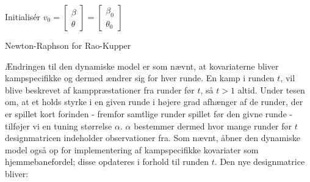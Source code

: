 \documentclass[11pt,a4paper]{article}
\begin{document}
\begin{algorithm}[H]
\SetAlgoLined
{}
 Initialisér $v_0 = \begin{bmatrix}
           \beta \\
           \theta
         \end{bmatrix} =\begin{bmatrix}
           \beta_0 \\
           \theta_0
         \end{bmatrix}\;$\\
 
\caption{Newton-Raphson for Rao-Kupper}\label{alg:RaoKupper}
\end{algorithm}
\par
Ændringen til den dynamiske model er som nævnt, at kovariaterne bliver kampspecifikke og dermed ændrer sig for hver runde. En kamp i runden $t$, vil blive beskrevet af kamppræstationer fra runder før $t$, så $t>1$ altid. Under tesen om, at et holds styrke i en given runde i højere grad afhænger af de runder, der er spillet kort forinden - fremfor samtlige runder spillet før den givne runde - tilføjer vi en tuning størrelse $\alpha$. $\alpha$ bestemmer dermed hvor mange runder før $t$ designmatricen indeholder observationer fra. Som nævnt, åbner den dynamiske model også op for implementering af kampspecifikke kovariater som hjemmebanefordel; disse opdateres i forhold til runden $t$. Den nye designmatrice bliver:
\end{document}
